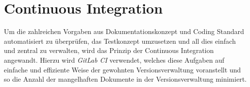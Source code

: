 \section{Continuous Integration}
Um die zahlreichen Vorgaben aus Dokumentationskonzept und Coding Standard automatisiert zu überprüfen, das Testkonzept  umzusetzen und all dies einfach und zentral zu verwalten, wird das Prinzip der Continuous Integration angewandt. Hierzu wird \textit{GitLab CI} verwendet, welches diese Aufgaben auf einfache und effiziente Weise der gewohnten Versionsverwaltung voranstellt und so die Anzahl der mangelhaften Dokumente in der Versionsverwaltung minimiert.